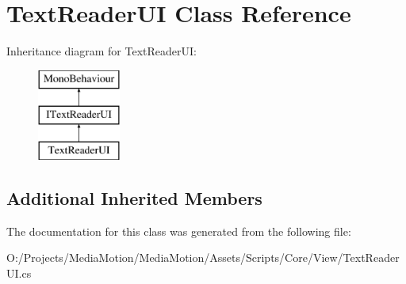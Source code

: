 \hypertarget{class_text_reader_u_i}{\section{Text\+Reader\+U\+I Class Reference}
\label{class_text_reader_u_i}
}
Inheritance diagram for Text\+Reader\+U\+I\+:\begin{figure}[H]
\begin{center}
\leavevmode
\includegraphics[height=3.000000cm]{class_text_reader_u_i}
\end{center}
\end{figure}
\subsection*{Additional Inherited Members}


The documentation for this class was generated from the following file\+:\begin{DoxyCompactItemize}
\item 
O\+:/\+Projects/\+Media\+Motion/\+Media\+Motion/\+Assets/\+Scripts/\+Core/\+View/Text\+Reader\+U\+I.\+cs\end{DoxyCompactItemize}
